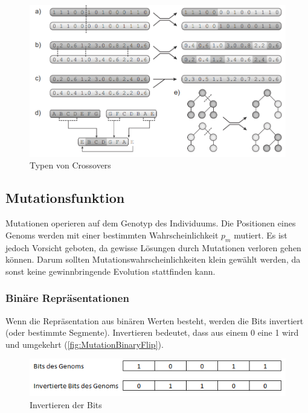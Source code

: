         \begin{figure}[H]
          \includegraphics[width=\textwidth,center]{graphics/crossover_types}
          \caption[\protect{}, S.27]{Typen von Crossovers\label{fig:crossTypes}}
        \end{figure}

    \subsection{Mutationsfunktion}

      Mutationen operieren auf dem Genotyp des Individuums.
      Die Positionen eines Genoms werden mit einer bestimmten Wahrscheinlichkeit \(p_{m}\) mutiert.
      Es ist jedoch Vorsicht geboten, da gewisse Lösungen durch Mutationen verloren gehen können.
      Darum sollten Mutationswahrscheinlichkeiten klein gewählt werden,
      da sonst keine gewinnbringende Evolution stattfinden kann.

      \subsubsection{Binäre Repräsentationen}

        Wenn die Repräsentation aus binären Werten besteht, werden die Bits invertiert (oder bestimmte Segmente).
        Invertieren bedeutet, dass aus einem 0 eine 1 wird und umgekehrt (\vref{fig:MutationBinaryFlip}).

        \begin{figure}[H]
          \includegraphics[scale=1,center]{graphics/mutation_binary_flip}
          \caption{Invertieren der Bits\label{fig:MutationBinaryFlip}}
        \end{figure}

